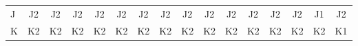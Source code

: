 \documentclass[twoside]{article}
\newenvironment{answer}{}{\medskip}
\begin{document}
\begin{answer}
\begin{table}[h]
\begin{latin}
\begin{tabular}{lccccccccccccccc}
J & J2                                & J2                               & J2                               & J2                               & J2                               & J2                               & J2                               & J2                               & J2                               & J2                               & J2                                & J2                                & J2                                & J1                                & J2                                \\
K & K2                                & K2                               & K2                               & K2                               & K2                               & K2                               & K2                               & K2                               & K2                               & K2                               & K2                                & K2                                & K2                                & K2                                & K1                               
	\end{tabular}
	\end{latin}
	\end{table}
\end{answer}
\end{document}
